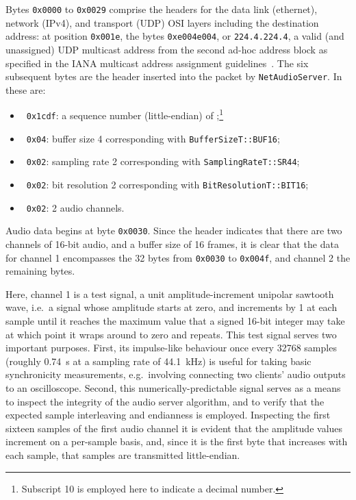 Bytes \texttt{0x0000} to \texttt{0x0029} comprise the headers for the data link
(ethernet), network (IPv4), and transport (UDP) OSI layers including the
destination address: at position \texttt{0x001e}, the bytes \texttt{0xe004e004},
or \texttt{224.4.224.4}, a valid (and unassigned) UDP multicast address from the
second ad-hoc address block as specified in the IANA multicast address
assignment guidelines~\citep{meyer_iana_2010}.
The six subsequent bytes are the header inserted into the packet by
\texttt{NetAudioServer}.
In  these are:
\begin{itemize}
    \item~\texttt{0x1cdf}: a sequence number (little-endian) of
    ;\footnote{Subscript 10 is employed here to indicate a decimal
    number.}
    \item~\texttt{0x04}: buffer size \num{4} corresponding with
    \texttt{BufferSizeT::BUF16};
    \item~\texttt{0x02}: sampling rate \num{2} corresponding with
    \texttt{SamplingRateT::SR44};
    \item~\texttt{0x02}: bit resolution \num{2} corresponding with
    \texttt{BitResolutionT::BIT16};
    \item~\texttt{0x02}: \num{2} audio channels.
\end{itemize}

Audio data begins at byte \texttt{0x0030}.
Since the header indicates that there are two channels of 16-bit audio, and a
buffer size of 16 frames, it is clear that the data for channel 1 encompasses
the 32 bytes from \texttt{0x0030} to \texttt{0x004f}, and channel 2 the
remaining bytes.

Here, channel 1 is a test signal, a unit amplitude-increment unipolar sawtooth
wave, i.e.\ a signal whose amplitude starts at zero, and increments by 1 at each
sample until it reaches the maximum value that a signed 16-bit integer may take
\textemdash{}  \textemdash{} at which point it wraps around to
zero and repeats.
This test signal serves two important purposes.
First, its impulse-like behaviour once every \num{32768} samples (roughly
\qty{.74}{\s} at a sampling rate of \qty{44.1}{\kHz}) is useful for taking basic
synchronicity measurements, e.g.\ involving connecting two clients' audio
outputs to an oscilloscope.
Second, this numerically-predictable signal serves as a means to inspect the
integrity of the audio server algorithm, and to verify that the expected
sample interleaving and endianness is employed.
Inspecting the first sixteen samples of the first audio channel
it is evident that the amplitude values increment on a per-sample basis, and,
since it is the first byte that increases with each sample, that samples are
transmitted little-endian.

